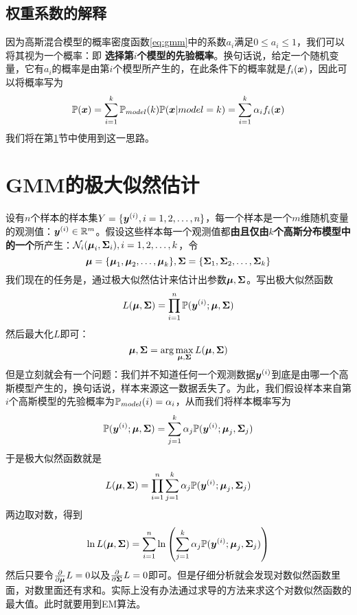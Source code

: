 \documentclass[a4paper,UTF8]{article}
\begin{document}
\subsection{权重系数的解释}

因为高斯混合模型的概率密度函数\ref{eq:gmm}中的系数\(a_i\)满足\(0\leqslant a_i \leqslant 1\)，我们可以将其视为一个概率：即\textbf{ 选择第$i$个模型的先验概率}。换句话说，给定一个随机变量，它有\(a_i\)的概率是由第$i$个模型所产生的，在此条件下的概率就是\(f_i(\boldsymbol{x})\)，因此可以将概率写为\begin{equation}
    \mathbb{P}(\boldsymbol{x})=\sum_{i=1}^k\mathbb{P}_{model}(k)\mathbb{P}(\boldsymbol{x}|model=k)=\sum_{i=1}^k\alpha_i f_i(\boldsymbol{x})
\end{equation}我们将在第\ref{section:gmm mle}节中使用到这一思路。

\section{GMM的极大似然估计}\label{section:gmm mle}
设有\(n\)个样本的样本集\(Y=\{\boldsymbol{y}^{(i)},i=1,2,\dotsc,n\}\)，每一个样本是一个\(m\)维随机变量的观测值：\(\boldsymbol{y}^{(i)}\in\mathbb{R}^m\)。假设这些样本每一个观测值都\textbf{由且仅由\(k\)个高斯分布模型中的一个}所产生：\(\mathcal{N}_i(\boldsymbol{\mu}_i,\boldsymbol{\Sigma}_i),i=1,2,\dotsc,k\)，令\[
    \boldsymbol{\mu}=\{\boldsymbol{\mu}_1,\boldsymbol{\mu}_2,\dotsc,\boldsymbol{\mu}_k\},\boldsymbol{\Sigma}=\{\boldsymbol{\Sigma}_1,\boldsymbol{\Sigma}_2,\dotsc,\boldsymbol{\Sigma}_k\}
\]我们现在的任务是，通过极大似然估计来估计出参数\(\boldsymbol{\mu},\boldsymbol{\Sigma}\)。写出极大似然函数\begin{equation}
    L(\boldsymbol{\mu},\boldsymbol{\Sigma})=\prod_{i=1}^n\mathbb{P}(\boldsymbol{y}^{(i)};\boldsymbol{\mu},\boldsymbol{\Sigma})
\end{equation}然后最大化\(L\)即可：\begin{equation}
    \boldsymbol{\mu},\boldsymbol{\Sigma}=\arg\max_{\boldsymbol{\mu},\boldsymbol{\Sigma}}L(\boldsymbol{\mu},\boldsymbol{\Sigma})
\end{equation}但是立刻就会有一个问题：我们并不知道任何一个观测数据\(\boldsymbol{y}^{(i)}\)到底是由哪一个高斯模型产生的，换句话说，样本来源这一数据丢失了。为此，我们假设样本来自第\(i\)个高斯模型的先验概率为\(\mathbb{P}_{model}(i)=\alpha_i\)，从而我们将样本概率写为\begin{equation}
    \mathbb{P}(\boldsymbol{y}^{(i)};\boldsymbol{\mu},\boldsymbol{\Sigma})=\sum_{j=1}^k\alpha_j\mathbb{P}(\boldsymbol{y}^{(i)};\boldsymbol{\mu}_j,\boldsymbol{\Sigma}_j)
\end{equation}于是极大似然函数就是\begin{equation}
    L(\boldsymbol{\mu},\boldsymbol{\Sigma})=\prod_{i=1}^n\sum_{j=1}^k\alpha_j\mathbb{P}(\boldsymbol{y}^{(i)};\boldsymbol{\mu}_j,\boldsymbol{\Sigma}_j)
\end{equation}两边取对数，得到\begin{equation}
    \ln L(\boldsymbol{\mu},\boldsymbol{\Sigma})=\sum_{i=1}^n\ln\left(
        \sum_{j=1}^k\alpha_j\mathbb{P}(\boldsymbol{y}^{(i)};\boldsymbol{\mu}_j,\boldsymbol{\Sigma}_j)
    \right)
\end{equation}然后只要令\(\frac{\partial}{\partial\boldsymbol{\mu}}L=0\)以及\(\frac{\partial}{\partial\boldsymbol{\Sigma}}L=0\)即可。但是仔细分析就会发现对数似然函数里面，对数里面还有求和。实际上没有办法通过求导的方法来求这个对数似然函数的最大值。此时就要用到EM算法。
\end{document}
